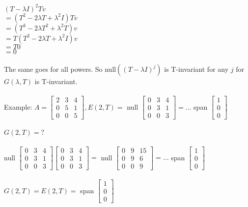 \documentclass{article}
\begin{document}
$(T- \lambda I)^2 Tv$\\
$ = (T^2 - 2\lambda T + \lambda ^2 I) Tv $\\
$= (T^3 - 2\lambda T^2 + \lambda^2 T) v$\\
$= T(T^2 - 2\lambda T + \lambda ^2 I) v$\\
$= T0$\\
$=0$\\\\
The same goes for all powers. So null$((T-\lambda I)^j)$ is T-invariant for any $j$ for $G(\lambda, T)$ is T-invariant. \\\\
Example: $A = \begin{bmatrix} 
2&3&4\\0&5&1\\0&0&5
\end{bmatrix}, E(2,T) = $ null $\begin{bmatrix}
    0&3&4\\0&3&1\\0&0&3
\end{bmatrix} = ... $ span $\begin{bmatrix}
    1\\0\\0
\end{bmatrix}$\\\\
$G(2,T) = ?$\\\\
null $\begin{bmatrix}
    0&3&4\\0&3&1\\0&0&3
\end{bmatrix} \begin{bmatrix}
    0&3&4\\0&3&1\\0&0&3
\end{bmatrix} = $ null $\begin{bmatrix}
    0&9&15\\0&9&6\\0&0&9
\end{bmatrix} = ...$ span $\begin{bmatrix}
    1\\0\\0
\end{bmatrix}$\\\\
$G(2,T) = E(2,T) =$ span $\begin{bmatrix}
    1\\0\\0
\end{bmatrix}$\\\\
\end{document}
